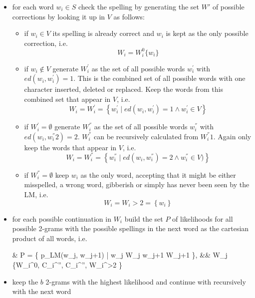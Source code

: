 \begin{itemize}
	\item for each word $w_i \in S$ check the spelling by generating the set $W'$ of possible corrections by looking it up in $V$ as follows:
	\begin{itemize}
		\item if $w_i \in V$ its spelling is already correct and $w_i$ is kept as the only possible correction, i.e.
		\begin{equation*}
		W_i = W_i^0\{ w_i \}
		\end{equation*}
		\item if $w_i \not\in V$ generate $W_i^{'}$ as the set of all possible words $w_i^{'}$ with $ed(w_i, w_i^{'}) = 1$. This is the combined set of all possible words with one character inserted, deleted or replaced. Keep the words from this combined set that appear in $V$, i.e.
		\begin{equation*}
		W_i = W_i^{'} = \left \{ w_i^{'} \mid ed(w_i, w_i^{'}) = 1 \land w_i^{'} \in V \right \}
		\end{equation*}
		\item if $W_i^{'} = \emptyset$ generate $W_i^{''}$ as the set of all possible words $w_i^{''}$ with $ed(w_i, w_i^
		{''}2) = 2$. $W_i^{''}$ can be recursively calculated from $W_i^{''}1$. Again only keep the words that appear in $V$, i.e.
		\begin{equation*}
		W_i = W_i^{''} = \left \{ w_i^{''} \mid ed(w_i, w_i^{''}) = 2 \land w_i^{''} \in V) \right \}
		\end{equation*}
		\item if $W_i^{''} = \emptyset$ keep $w_i$ as the only word, accepting that it might be either misspelled, a wrong word, gibberish or simply has never been seen by the \ac{LM}, i.e.
		\begin{equation*}
		W_i = W_i{>2} = \left \{ w_i  \right \}
		\end{equation*}
	\end{itemize}
	\item for each possible continuation in $W_i$ build the set $P$ of likelihoods for all possible 2-grams with the possible spellings in the next word as the cartesian product of all words, i.e.
	\begin{flalign*}
	&	P = \{ p_{LM}(w_j, w_{j+1}) | w_j \in W_j \land w_{j+1} \in W_{j+1} \}{,} && W_j \in \{W_i^0, C_i^{''}, C_i^{''}, W_i^{>2} \}
	\end{flalign*}
	\item keep the $b$ 2-grams with the highest likelihood and continue with recursively with the next word
\end{itemize}

